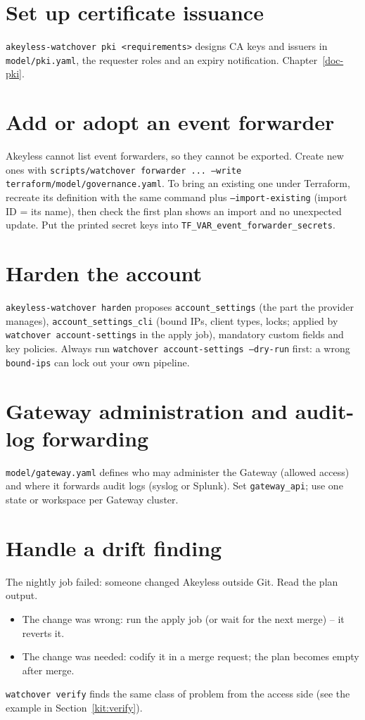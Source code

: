 \section{Set up certificate issuance}
\texttt{akeyless-watchover pki <requirements>} designs CA keys and issuers in
\texttt{model/pki.yaml}, the requester roles and an expiry notification. Chapter~\ref{doc-pki}.

\section{Add or adopt an event forwarder}
Akeyless cannot list event forwarders, so they cannot be exported. Create new ones with
\texttt{scripts/watchover forwarder ... --write terraform/model/governance.yaml}. To bring an
existing one under Terraform, recreate its definition with the same command plus
\texttt{--import-existing} (import ID = its name), then check the first plan shows an import and no
unexpected update. Put the printed secret keys into \texttt{TF\_VAR\_event\_forwarder\_secrets}.

\section{Harden the account}
\texttt{akeyless-watchover harden} proposes \texttt{account\_settings} (the part the provider
manages), \texttt{account\_settings\_cli} (bound IPs, client types, locks; applied by
\texttt{watchover account-settings} in the apply job), mandatory custom fields and key policies.
Always run \texttt{watchover account-settings --dry-run} first: a wrong \texttt{bound-ips} can lock
out your own pipeline.

\section{Gateway administration and audit-log forwarding}
\texttt{model/gateway.yaml} defines who may administer the Gateway (allowed access) and where it
forwards audit logs (syslog or Splunk). Set \texttt{gateway\_api}; use one state or workspace per
Gateway cluster.

\section{Handle a drift finding}
The nightly job failed: someone changed Akeyless outside Git. Read the plan output.
\begin{itemize}
\item The change was wrong: run the apply job (or wait for the next merge) -- it reverts it.
\item The change was needed: codify it in a merge request; the plan becomes empty after merge.
\end{itemize}
\texttt{watchover verify} finds the same class of problem from the access side (see the example in
Section~\ref{kit:verify}).
